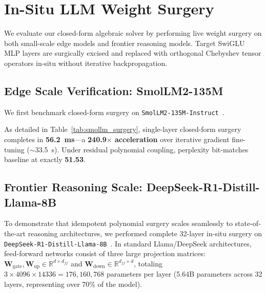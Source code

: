 \documentclass[journal,lettersize]{IEEEtran}
\begin{document}
\section{In-Situ LLM Weight Surgery}
We evaluate our closed-form algebraic solver by performing live weight surgery on both small-scale edge models and frontier reasoning models. Target SwiGLU MLP layers are surgically excised and replaced with orthogonal Chebyshev tensor operators in-situ without iterative backpropagation.

\subsection{Edge Scale Verification: SmolLM2-135M}
We first benchmark closed-form surgery on \texttt{SmolLM2-135M-Instruct}~\cite{allal2024smollm2}.
\begin{table}[h]
\centering
\caption{Empirical Weight Surgery on SmolLM2-135M}
\label{tab:smollm_surgery}
\end{table}

As detailed in Table~\ref{tab:smollm_surgery}, single-layer closed-form surgery completes in \textbf{56.2~ms}---a \textbf{240.9$\times$ acceleration} over iterative gradient fine-tuning ($\sim$33.5~s). Under residual polynomial coupling, perplexity bit-matches baseline at exactly \textbf{51.53}.

\subsection{Frontier Reasoning Scale: DeepSeek-R1-Distill-Llama-8B}
To demonstrate that idempotent polynomial surgery scales seamlessly to state-of-the-art reasoning architectures, we performed complete 32-layer in-situ surgery on \texttt{DeepSeek-R1-Distill-Llama-8B}~\cite{deepseek2025r1}. In standard Llama/DeepSeek architectures, feed-forward networks consist of three large projection matrices: $\mathbf{W}_{\text{gate}}, \mathbf{W}_{\text{up}} \in \mathbb{R}^{d \times d_{ff}}$ and $\mathbf{W}_{\text{down}} \in \mathbb{R}^{d_{ff} \times d}$, totaling $3 \times 4096 \times 14336 = 176,160,768$ parameters per layer (5.64B parameters across 32 layers, representing over 70\% of the model).
\end{document}
